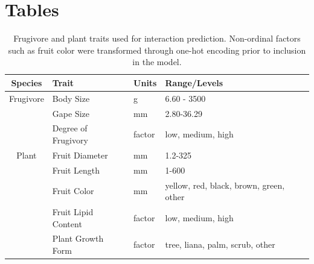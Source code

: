 \documentclass[num-refs]{wiley-article}%
\begin{document}
\clearpage 

\section*{Tables} 


\begin{table}[!h]
\caption{Frugivore and plant traits used for interaction prediction. Non-ordinal factors such as fruit color were transformed through one-hot encoding prior to inclusion in the model.}
\label{tab:traits}
\begin{tabular}{clll} 
 \hline
 Species & Trait & Units & Range/Levels \\  
 \hline
 \hline
Frugivore & Body Size &  g &  6.60 - 3500 \\
& Gape Size &   mm  & 2.80-36.29  \\  
& Degree of Frugivory & factor   &  low, medium, high \\  
Plant & Fruit Diameter &  mm  & 1.2-325  \\
& Fruit Length &  mm  &  1-600 \\
& Fruit Color &  mm  & yellow, red, black, brown, green, other \\
& Fruit Lipid Content & factor   &  low, medium, high  \\ 
& Plant Growth Form &   factor  &  tree, liana, palm, scrub, other \\ 
 \hline
\end{tabular}
\end{table}


\clearpage 
\end{document}
